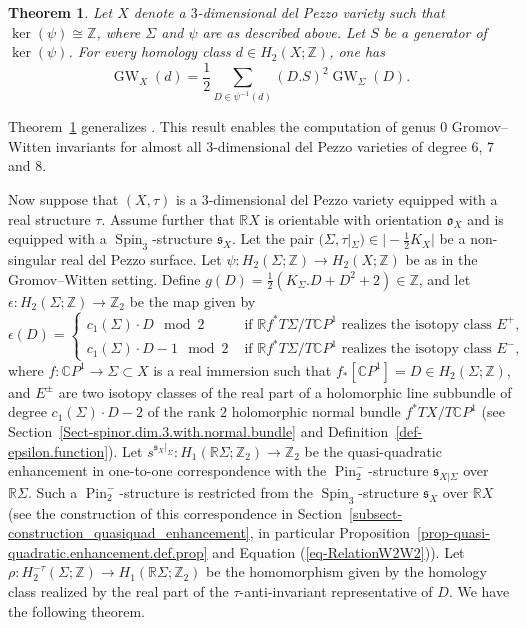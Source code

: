 \documentclass[11pt]{amsart}
\numberwithin{equation}{section}
\theoremstyle{definition}
\theoremstyle{plain}
\newtheorem{theorem}[definition]{Theorem}
\theoremstyle{remark}
\newcommand{\R}{\mathbb{R}}
\newcommand{\Z}{\mathbb{Z}}
\newcommand{\C}{\mathbb{C}}
\DeclareMathOperator{\GW}{GW}
\DeclareMathOperator{\Pin}{Pin}
\DeclareMathOperator{\Spin}{Spin}
\begin{document}
\begin{theorem}\label{Theorem1-GW} 
Let $X$ denote a $3$-dimensional del Pezzo variety such that $\ker(\psi) \cong \Z$, where $\Sigma$ and $\psi$ are as described above. Let $S$ be a generator of\, $\ker (\psi)$.
For every homology class $d\in H_2(X;\Z)$, one has
$$\GW_X(d)=\frac{1}{2}\sum_{D\in \psi^{-1}(d)}(D.S)^2 \GW_{\Sigma}(D).$$
\end{theorem}

Theorem~\ref{Theorem1-GW}  generalizes  \cite[Theorem 2]{brugalle2016pencils}. This result enables the computation of  genus $0$ Gromov--Witten invariants for almost  all $3$-dimensional  del Pezzo varieties of degree $6$, $7$ and $8$.

Now suppose that $(X,\tau)$ is a $3$-dimensional del Pezzo variety equipped with a real structure $\tau$. Assume further that $\R X$ is orientable with orientation $\mathfrak{o}_X$ and is equipped with a $\Spin_3$-structure $\mathfrak{s}_X$.  Let the pair $(\Sigma,\tau|_\Sigma) \in |-\frac{1}{2}K_X|$  be a non-singular real del Pezzo surface. Let $\psi\colon H_2(\Sigma;\mathbb{Z})\to H_2(X;\mathbb{Z})$ be as in the Gromov--Witten setting. Define $g(D)=\frac{1}{2}(K_\Sigma . D +D^2+2) \in \Z$, and let $\epsilon\colon H_2(\Sigma;\mathbb{Z})\to \mathbb{Z}_2$ be the map     given by
$$\epsilon(D)=
\begin{cases}
  c_1(\Sigma)\cdot D \mod 2 & \text{ if } \R f^* T \Sigma /T \C P^1 \text{ realizes the isotopy class } E^+,\\
  c_1(\Sigma)\cdot D-1 \mod 2 &\text{ if } \R f^* T \Sigma /T \C P^1\text{ realizes the isotopy class } E^-,
  \end{cases}$$
 where $f\colon \C P^1\to \Sigma\subset X$ is a  real immersion such that $f_*[\C P^1]=D\in H_2(\Sigma;\mathbb{Z})$, and  $E^\pm$ are two isotopy classes of the real part of a holomorphic line subbundle of degree $c_1(\Sigma)\cdot D-2$ of the rank $2$ holomorphic normal  bundle $f^*T X/T \C P^1$ (see Section~\ref{Sect-spinor.dim.3.with.normal.bundle} and Definition~\ref{def-epsilon.function}). Let  $s^{\mathfrak{s}_X|_\Sigma}\colon H_1(\R \Sigma;\Z_2)\to \Z_2$
be the quasi-quadratic enhancement in one-to-one correspondence with the $\Pin^-_2$-structure $\mathfrak{s}_{X|\Sigma}$ over $\R \Sigma$. Such a $\Pin^-_2$-structure  is restricted from the $\Spin_3$-structure $\mathfrak{s}_X$ over $\R X$ (see the construction of this correspondence in Section~\ref{subsect-construction_quasiquad_enhancement}, in particular Proposition~\ref{prop-quasi-quadratic.enhancement.def.prop} and Equation (\ref{eq-RelationW2W2})). Let $\rho\colon  H_2^{-\tau}(\Sigma;\Z) \to H_1(\R \Sigma;\Z_2)$ be the homomorphism given by the homology class realized by the real part of the $\tau$-anti-invariant representative of $D$. We have the following theorem.
\end{document}
